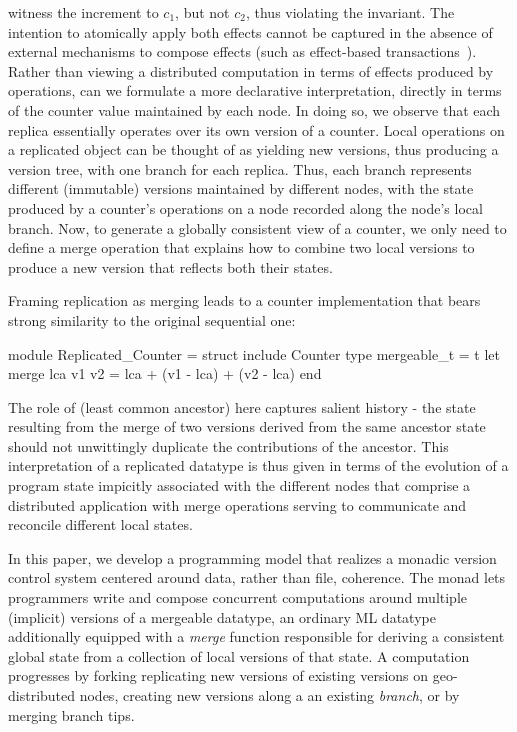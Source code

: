 witness the increment to $c_1$, but not $c_2$, thus violating the
invariant. The intention to atomically apply both effects cannot be
captured in the absence of external mechanisms to compose effects
(such as effect-based transactions~\cite{pldi15}).  Rather than
viewing a distributed computation in terms of  effects produced
by operations, can we formulate a more declarative interpretation,
directly in terms of the counter value maintained by each node.  In
doing so, we observe that each replica essentially operates over its
own version of a counter.  Local operations on a replicated object can
be thought of as yielding new versions, thus producing a version tree,
with one branch for each replica.  Thus, each branch represents
different (immutable) versions maintained by different nodes, with the
state produced by a counter's operations on a node recorded along the
node's local branch.  Now, to generate a globally consistent view of a
counter, we only need to define a merge operation that explains how to
combine two local versions to produce a new version that reflects both
their states.

Framing replication as merging leads to a counter implementation that
bears strong similarity to the original sequential one:
  \begin{ocaml}
    module Replicated_Counter = struct
      include Counter
      type mergeable_t = t 
      let merge lca v1 v2 =
         lca + (v1 - lca) + (v2 - lca)
    end
  \end{ocaml}

The role of  (least common ancestor) here captures salient
history - the state resulting from the merge of two versions derived
from the same ancestor state should not unwittingly duplicate the
contributions of the ancestor.  This interpretation of a replicated
datatype is thus given in terms of the evolution of a program state
impicitly associated with the different nodes that comprise a
distributed application with merge operations serving to communicate
and reconcile different local states.

In this paper, we develop a programming model that realizes a monadic
version control system centered around data, rather than file,
coherence.  The \name monad lets programmers write and compose
concurrent computations around multiple (implicit) versions of a
mergeable datatype, an ordinary ML datatype additionally equipped with
a \emph{merge} function responsible for deriving a consistent global
state from a collection of local versions of that state.  A
computation progresses by forking replicating new versions of existing
versions on geo-distributed nodes, creating new versions along a an
existing \emph{branch}, or by merging branch tips.

